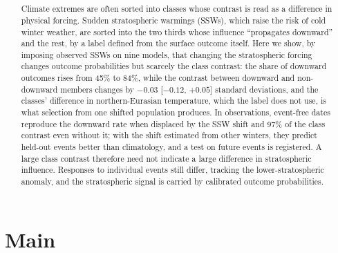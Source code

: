 \documentclass[11pt]{article}
\title{\bfseries\papertitle}
\author{\paperauthors}
\date{}
\begin{document}
\maketitle
\thispagestyle{empty}
\linenumbers

\begin{abstract}
\noindent Climate extremes are often sorted into classes whose contrast is read as a difference in physical forcing. Sudden stratospheric warmings (SSWs), which raise the risk of cold winter weather, are sorted into the two thirds whose influence ``propagates downward'' and the rest, by a label defined from the surface outcome itself. Here we show, by imposing observed SSWs on nine models, that changing the stratospheric forcing changes outcome probabilities but scarcely the class contrast: the share of downward outcomes rises from 45\% to 84\%, while the contrast between downward and non-downward members changes by $-0.03$ [$-0.12$, $+0.05$] standard deviations, and the classes' difference in northern-Eurasian temperature, which the label does not use, is what selection from one shifted population produces. In observations, event-free dates reproduce the downward rate when displaced by the SSW shift and 97\% of the class contrast even without it; with the shift estimated from other winters, they predict held-out events better than climatology, and a test on future events is registered. A large class contrast therefore need not indicate a large difference in stratospheric influence. Responses to individual events still differ, tracking the lower-stratospheric anomaly, and the stratospheric signal is carried by calibrated outcome probabilities.
\end{abstract}

\section*{Main}
\end{document}
